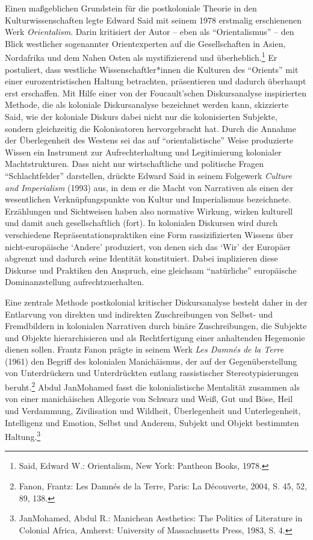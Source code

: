 \documentclass[a4paper,
fontsize=11pt,
oneside,
numbers=noperiodatend,
parskip=half-,
bibliography=totoc,
final
]{scrartcl}
\begin{document}
Einen maßgeblichen Grundstein für die postkoloniale Theorie in den
Kulturwissenschaften legte Edward Said mit seinem 1978 erstmalig
erschienenen Werk \emph{Orientalism}. Darin kritisiert der Autor -- eben
als \enquote{Orientalismus} -- den Blick westlicher sogenannter
Orientexperten auf die Gesellschaften in Asien, Nordafrika und dem Nahen
Osten als mystifizierend und überheblich.\footnote{Said, Edward W.:
  Orientalism, New York: Pantheon Books, 1978.} Er postuliert, dass
westliche Wissenschaftler*innen die Kulturen des \enquote{Orients} mit
einer eurozentristischen Haltung betrachten, präsentieren und dadurch
überhaupt erst erschaffen. Mit Hilfe einer von der Foucault'schen
Diskursanalyse inspirierten Methode, die als koloniale Diskursanalyse
bezeichnet werden kann, skizzierte Said, wie der koloniale Diskurs dabei
nicht nur die kolonisierten Subjekte, sondern gleichzeitig die
Kolonisatoren hervorgebracht hat. Durch die Annahme der Überlegenheit
des Westens sei das auf \enquote{orientalistische} Weise produzierte
Wissen ein Instrument zur Aufrechterhaltung und Legitimierung kolonialer
Machtstrukturen. Dass nicht nur wirtschaftliche und politische Fragen
\enquote{Schlachtfelder} darstellen, drückte Edward Said in seinem
Folgewerk \emph{Culture and Imperialism} (1993) aus, in dem er die Macht
von Narrativen als einen der wesentlichen Verknüpfungspunkte von Kultur
und Imperialismus bezeichnete. Erzählungen und Sichtweisen haben also
normative Wirkung, wirken kulturell und damit auch gesellschaftlich
(fort). In kolonialen Diskursen wird durch verschiedene
Repräsentationspraktiken eine Form rassizifizierten Wissens über
nicht-europäische \enquote*{Andere} produziert, von denen sich das
\enquote*{Wir} der Europäer abgrenzt und dadurch seine Identität
konstituiert. Dabei implizieren diese Diskurse und Praktiken den
Anspruch, eine gleichsam \enquote{natürliche} europäische
Dominanzstellung aufrechtzuerhalten.

Eine zentrale Methode postkolonial kritischer Diskursanalyse besteht
daher in der Entlarvung von direkten und indirekten Zuschreibungen von
Selbst- und Fremdbildern in kolonialen Narrativen durch binäre
Zuschreibungen, die Subjekte und Objekte hierarchisieren und als
Rechtfertigung einer anhaltenden Hegemonie dienen sollen. Frantz Fanon
prägte in seinem Werk \emph{Les Damnés de la Terre} (1961) den Begriff
des kolonialen Manichäismus, der auf der Gegenüberstellung von
Unterdrückern und Unterdrückten entlang rassistischer
Stereotypisierungen beruht.\footnote{Fanon, Frantz: Les Damnés de la
  Terre, Paris: La Découverte, 2004, S. 45, 52, 89, 138.} Abdul
JanMohamed fasst die kolonialistische Mentalität zusammen als von einer
manichäischen Allegorie von Schwarz und Weiß, Gut und Böse, Heil und
Verdammung, Zivilisation und Wildheit, Überlegenheit und Unterlegenheit,
Intelligenz und Emotion, Selbst und Anderem, Subjekt und Objekt
bestimmten Haltung.\footnote{JanMohamed, Abdul R.: Manichean Aesthetics:
  The Politics of Literature in Colonial Africa, Amherst: University of
  Massachusetts Press, 1983, S. 4.}
\end{document}
